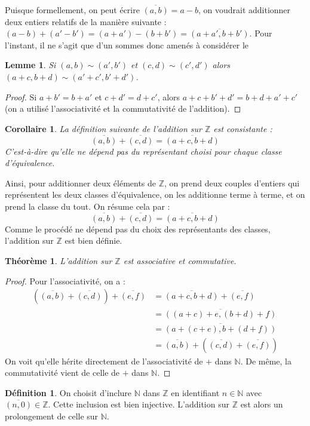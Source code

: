 \documentclass[french]{book}
\newcommand{\Z}{\mathbb{Z}}
\theoremstyle{plain}
\newtheorem{thm}{Théorème}[chapter]
\newtheorem{lem}{Lemme}[chapter]
\newtheorem{cor}{Corollaire}[chapter]
\theoremstyle{definition}
\newtheorem{dfn}{Définition}[chapter]
\theoremstyle{remark}
\begin{document}
Puisque formellement, on peut écrire $\overline{(a,b)} = a - b$, on voudrait additionner deux entiers relatifs de la manière suivante : $(a - b) + (a' - b') = (a + a') - (b + b') = \overline{(a + a', b + b')}$. Pour l'instant, il ne s'agit que d'un sommes donc amenés à considérer le
\begin{lem}
	Si $(a,b)\sim(a',b')$ et $(c,d)\sim(c',d')$ alors $(a + c, b + d)\sim(a' + c', b' + d')$.
\end{lem}
\begin{proof}
	Si $a + b' = b + a'$ et $c + d' = d + c'$, alors $a + c + b' + d' = b + d + a' + c'$ (on a utilisé l'associativité et la commutativité de l'addition).
\end{proof}
\begin{cor}
	La définition suivante de l'addition sur $\Z$ est consistante : $$\overline{(a,b)} + \overline{(c,d)} = \overline{(a + c, b + d)}$$
	C'est-à-dire qu'elle ne dépend pas du représentant choisi pour chaque classe d'équivalence.
\end{cor}
Ainsi, pour additionner deux éléments de $\mathbb{Z}$, on prend deux couples d'entiers qui représentent les deux classes d'équivalence, on les additionne terme à terme, et on prend la classe du tout. On résume cela par : $$\overline{(a,b)} + \overline{(c,d)} = \overline{(a+c, b+d)}$$
Comme le procédé ne dépend pas du choix des représentants des classes, l'addition sur $\mathbb{Z}$ est bien définie.
\begin{thm}
	L'addition sur $\mathbb{Z}$ est associative et commutative.
\end{thm}
\begin{proof}
	Pour l'associativité, on a :
\begin{align*}
	\left(\overline{(a,b)} + \overline{(c,d)}\right) + \overline{(e,f)} &= \overline{(a+c, b+d)} + \overline{(e,f)} \\ &= \overline{((a+c)+e, (b+d)+f)} \\&= \overline{(a+(c+e), b+(d+f))} \\&= \overline{(a,b)} + \left(\overline{(c,d)} + \overline{(e,f)}\right)
\end{align*}
On voit qu'elle hérite directement de l'associativité de $+$ dans $\mathbb{N}$. De même, la commutativité vient de celle de $+$ dans $\mathbb{N}$.
\end{proof}
\begin{dfn}
	On choisit d'inclure $\mathbb{N}$ dans $\mathbb{Z}$ en identifiant $n \in \mathbb{N}$ avec $\overline{(n,0)} \in \mathbb{Z}$. Cette inclusion est bien injective. L'addition sur $\mathbb{Z}$ est alors un prolongement de celle sur $\mathbb{N}$.
\end{dfn}
\end{document}
